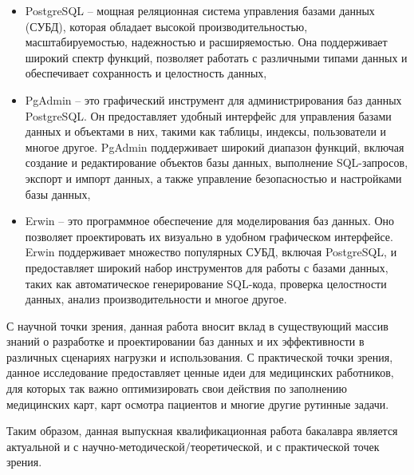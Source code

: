 \begin{itemize}
    \item PostgreSQL – мощная реляционная система управления базами данных (СУБД), которая обладает высокой производительностью, масштабируемостью, надежностью и расширяемостью. Она поддерживает широкий спектр функций, позволяет работать с различными типами данных и обеспечивает сохранность и целостность данных,
    \item PgAdmin – это графический инструмент для администрирования баз данных PostgreSQL. Он предоставляет удобный интерфейс для управления базами данных и объектами в них, такими как таблицы, индексы, пользователи и многое другое. PgAdmin поддерживает широкий диапазон функций, включая создание и редактирование объектов базы данных, выполнение SQL-запросов, экспорт и импорт данных, а также управление безопасностью и настройками базы данных,
    \item Erwin – это программное обеспечение для моделирования баз данных. Оно позволяет проектировать их визуально в удобном графическом интерфейсе. Erwin поддерживает множество популярных СУБД, включая PostgreSQL, и предоставляет широкий набор инструментов для работы с базами данных, таких как автоматическое генерирование SQL-кода, проверка целостности данных, анализ производительности и многое другое.
\end{itemize}

С научной точки зрения, данная работа вносит вклад в существующий массив знаний о разработке и проектировании баз данных и их эффективности в различных сценариях нагрузки и использования. С практической точки зрения, данное исследование предоставляет ценные идеи для медицинских работников, для которых так важно оптимизировать свои действия по заполнению медицинских карт, карт осмотра пациентов и многие другие рутинные задачи.

Таким образом, данная выпускная квалификационная работа бакалавра является актуальной и с научно-методической/теоретической, и с практической точек зрения.